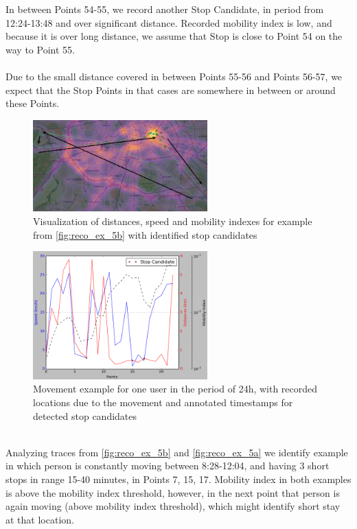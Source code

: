 \\\\
In between Points 54-55, we record another Stop Candidate, in period from 12:24-13:48 and over significant distance. Recorded mobility index is low, and because it is over long distance, we assume that Stop is close to Point 54 on the way to Point 55. 
\\\\
Due to the small distance covered in between Points 55-56 and Points 56-57, we expect that the Stop Points in that cases are somewhere in between or around these Points. 
\begin{figure}[!ht]
	\centering
	\includegraphics[width=0.6\textwidth]{images/reco_example_5a.png}
	\caption{ Visualization of distances, speed and mobility indexes for example from \autoref{fig:reco_ex_5b} with identified stop candidates }
	\label{fig:reco_ex_5a}
\end{figure} 
\begin{figure}[!ht]
	\centering
	\includegraphics[width=0.6\textwidth]{images/reco_example_5b.png}
	\caption{ Movement example for one user in the period of 24h, with recorded locations due to the movement and annotated timestamps for detected stop candidates }
	\label{fig:reco_ex_5b}
\end{figure}
\\
Analyzing traces from \autoref{fig:reco_ex_5b} and \autoref{fig:reco_ex_5a} we identify example in which person is constantly moving between 8:28-12:04, and having 3 short stops in range 15-40 minutes, in Points 7, 15, 17. Mobility index in both examples is above the mobility index threshold, however, in the next point that person is again moving (above mobility index threshold), which might identify short stay at that location. 
